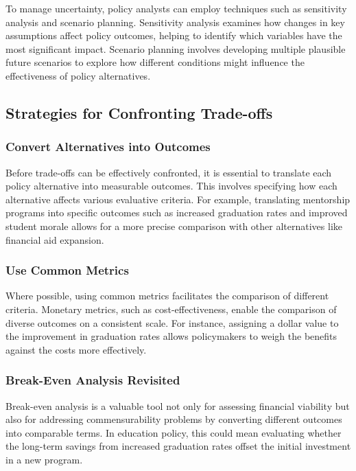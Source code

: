\documentclass{article}
\theoremstyle{definition}
\theoremstyle{plain}
\begin{document}
To manage uncertainty, policy analysts can employ techniques such as sensitivity analysis and scenario planning. Sensitivity analysis examines how changes in key assumptions affect policy outcomes, helping to identify which variables have the most significant impact. Scenario planning involves developing multiple plausible future scenarios to explore how different conditions might influence the effectiveness of policy alternatives.

\subsection{Strategies for Confronting Trade-offs}

\subsubsection{Convert Alternatives into Outcomes}

Before trade-offs can be effectively confronted, it is essential to translate each policy alternative into measurable outcomes. This involves specifying how each alternative affects various evaluative criteria. For example, translating mentorship programs into specific outcomes such as increased graduation rates and improved student morale allows for a more precise comparison with other alternatives like financial aid expansion.

\subsubsection{Use Common Metrics}

Where possible, using common metrics facilitates the comparison of different criteria. Monetary metrics, such as cost-effectiveness, enable the comparison of diverse outcomes on a consistent scale. For instance, assigning a dollar value to the improvement in graduation rates allows policymakers to weigh the benefits against the costs more effectively.

\subsubsection{Break-Even Analysis Revisited}

Break-even analysis is a valuable tool not only for assessing financial viability but also for addressing commensurability problems by converting different outcomes into comparable terms. In education policy, this could mean evaluating whether the long-term savings from increased graduation rates offset the initial investment in a new program.
\end{document}
